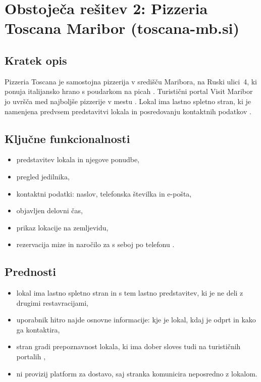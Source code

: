 \documentclass[12pt,a4paper]{article}
\begin{document}
\section{Obstoječa rešitev 2: Pizzeria Toscana Maribor (toscana-mb.si)}

\subsection*{Kratek opis}
Pizzeria Toscana je samostojna pizzerija v središču Maribora, na Ruski
ulici~4, ki ponuja italijansko hrano s poudarkom na picah \cite{toscanaKupi}.
Turistični portal Visit Maribor jo uvršča med najboljše pizzerije v mestu
\cite{visitmaribor}. Lokal ima lastno spletno stran, ki je namenjena
predvsem predstavitvi lokala in posredovanju kontaktnih podatkov
\cite{toscana}.

\subsection*{Ključne funkcionalnosti}
\begin{itemize}
  \item predstavitev lokala in njegove ponudbe,
  \item pregled jedilnika,
  \item kontaktni podatki: naslov, telefonska številka in e-pošta,
  \item objavljen delovni čas,
  \item prikaz lokacije na zemljevidu,
  \item rezervacija mize in naročilo za s seboj po telefonu \cite{toscanaKupi}.
\end{itemize}

\subsection*{Prednosti}
\begin{itemize}
  \item lokal ima lastno spletno stran in s tem lastno predstavitev,
        ki je ne deli z drugimi restavracijami,
  \item uporabnik hitro najde osnovne informacije: kje je lokal, kdaj je
        odprt in kako ga kontaktira,
  \item stran gradi prepoznavnost lokala, ki ima dober sloves tudi na
        turističnih portalih \cite{visitmaribor},
  \item ni provizij platform za dostavo, saj stranka komunicira neposredno
        z lokalom.
\end{itemize}
\end{document}
